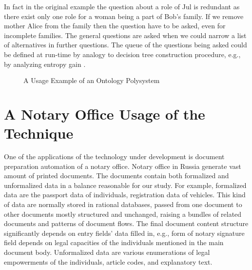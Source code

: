 \documentclass[conference]{IEEEtran}
\begin{document}
In fact in the original example the question about a role of
Jul is redundant as there exist only one role for a woman being a part
of Bob's family.  If we remove mother Alice from the family then the
question have to be asked, even for incomplete families.  The general
questions are asked when we could narrow a list of alternatives in
further questions.  The queue of the questions being asked could be
defined at run-time by analogy to decision tree construction
procedure, e.g., by analyzing entropy gain \cite{dectrees}.

\begin{figure}
\centering\footnotesize\sf
\def\svgwidth{0.9\linewidth}

\caption{A Usage Example of an Ontology Polysystem}
\label{OPSA}
\end{figure}








\section{A Notary Office Usage of the Technique}

One of the applications of the technology under development is
document preparation automation of a notary office.  Notary office in
Russia generate vast amount of printed documents.  The documents
contain both formalized and unformalized data in a balance reasonable
for our study.  For example, formalized data are the passport data of
individuals, registration data of vehicles.  This kind of data are
normally stored in rational databases, passed from one document to
other documents mostly structured and unchanged, raising a bundles of
related documents and patterns of document flows.  The final document
content structure significantly depends on entry fields’ data filled
in, e.g., form of notary signature field depends on legal capacities of the
individuals mentioned in the main document body.
Unformalized data are various enumerations of legal empowerments of
the individuals, article codes, and explanatory text.
\end{document}
